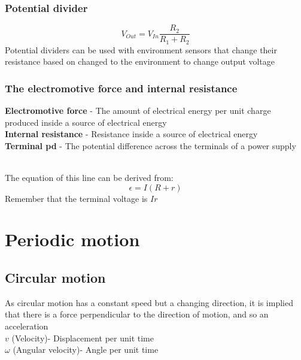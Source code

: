 \documentclass[12pt]{article}
\begin{document}
\subsubsection{Potential divider}
$$V_{Out}=V_{In}\frac{R_2}{R_1+R_2}$$
Potential dividers can be used with environment sensors that change their resistance based on changed to the environment to change output voltage
\subsubsection{The electromotive force and internal resistance}
\textbf{Electromotive force} - The amount of electrical energy per unit charge produced inside a source of electrical energy\\
\textbf{Internal resistance} - Resistance inside a source of electrical energy\\
\textbf{Terminal pd} - The potential difference across the terminals of a power supply\\
\\
The equation of this line can be derived from:
$$\epsilon=I(R+r)$$
Remember that the terminal voltage is $Ir$
\newpage
\section{Periodic motion}
\subsection{Circular motion}
As circular motion has a constant speed but a changing direction, it is implied that there is a force perpendicular to the direction of motion, and so an acceleration\\
$v$ (Velocity)- Displacement per unit time\\
$\omega$ (Angular velocity)- Angle per unit time\\
\end{document}
